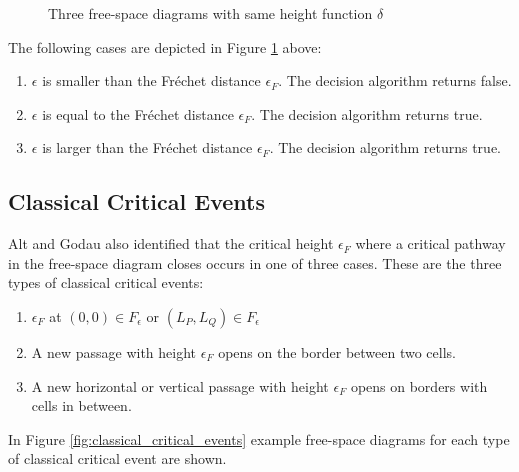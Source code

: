 \begin{figure}[H]
    \centering
    
    \qquad
    \qquad
	\caption{Three free-space diagrams with same height function $\delta$\protect\footnotemark}
    \label{fig:freespace_decision}
\end{figure}


The following cases are depicted in Figure \ref{fig:freespace_decision} above:
\begin{enumerate}[label=(\alph*)]
	\item $\epsilon$ is smaller than the Fréchet distance $\epsilon_F$. The decision algorithm returns false.
	\item $\epsilon$ is equal to the Fréchet distance $\epsilon_F$. The decision algorithm returns true.
	\item $\epsilon$ is larger than the Fréchet distance $\epsilon_F$. The decision algorithm returns true.
\end{enumerate}


\subsection{Classical Critical Events}

Alt and Godau also identified that the critical height $\epsilon_F$ where a critical pathway in the free-space diagram closes occurs in one of three cases. These are the three types of classical critical events:

\begin{enumerate}[label=(\alph*)]
	\item $\epsilon_F$ at $(0, 0) \in F_\epsilon$ or $(L_P, L_Q) \in F_\epsilon$
	\item A new passage with height $\epsilon_F$ opens on the border between two cells.
	\item A new horizontal or vertical passage with height $\epsilon_F$ opens on borders with cells in between.
\end{enumerate}

In Figure \ref{fig:classical_critical_events} example free-space diagrams for each type of classical critical event are shown.

